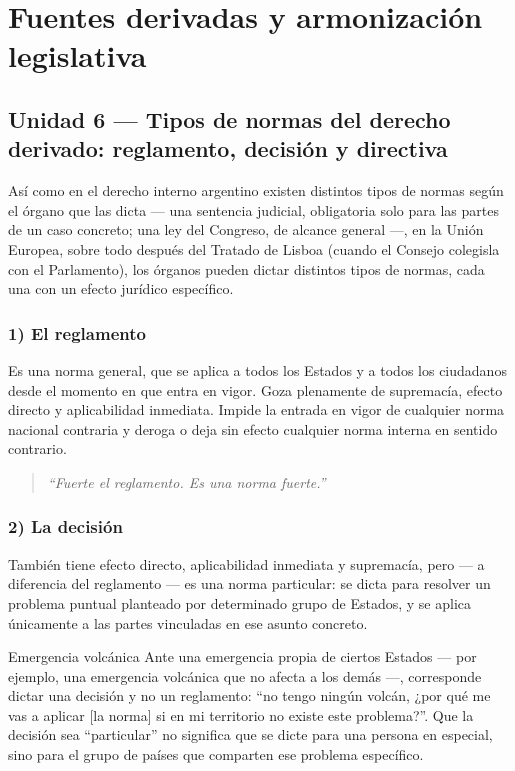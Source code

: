 \documentclass[12pt,oneside]{book}
\begin{document}
\chapter{Fuentes derivadas y armonización legislativa}

\section{Unidad 6 --- Tipos de normas del derecho derivado: reglamento, decisión y directiva}

Así como en el derecho interno argentino existen distintos tipos de normas según el órgano que las dicta --- una sentencia judicial, obligatoria solo para las partes de un caso concreto; una ley del Congreso, de alcance general ---, en la Unión Europea, sobre todo después del Tratado de Lisboa (cuando el Consejo colegisla con el Parlamento), los órganos pueden dictar distintos tipos de normas, cada una con un efecto jurídico específico.

\subsection*{1) El reglamento}

Es una norma general, que se aplica a todos los Estados y a todos los ciudadanos desde el momento en que entra en vigor. Goza plenamente de supremacía, efecto directo y aplicabilidad inmediata. Impide la entrada en vigor de cualquier norma nacional contraria y deroga o deja sin efecto cualquier norma interna en sentido contrario.

\begin{quote}
\itshape ``Fuerte el reglamento. Es una norma fuerte.''
\end{quote}

\subsection*{2) La decisión}

También tiene efecto directo, aplicabilidad inmediata y supremacía, pero --- a diferencia del reglamento --- es una norma particular: se dicta para resolver un problema puntual planteado por determinado grupo de Estados, y se aplica únicamente a las partes vinculadas en ese asunto concreto.

\begin{example}{Emergencia volcánica}
Ante una emergencia propia de ciertos Estados --- por ejemplo, una emergencia volcánica que no afecta a los demás ---, corresponde dictar una decisión y no un reglamento: ``no tengo ningún volcán, ¿por qué me vas a aplicar [la norma] si en mi territorio no existe este problema?''. Que la decisión sea ``particular'' no significa que se dicte para una persona en especial, sino para el grupo de países que comparten ese problema específico.
\end{example}
\end{document}
